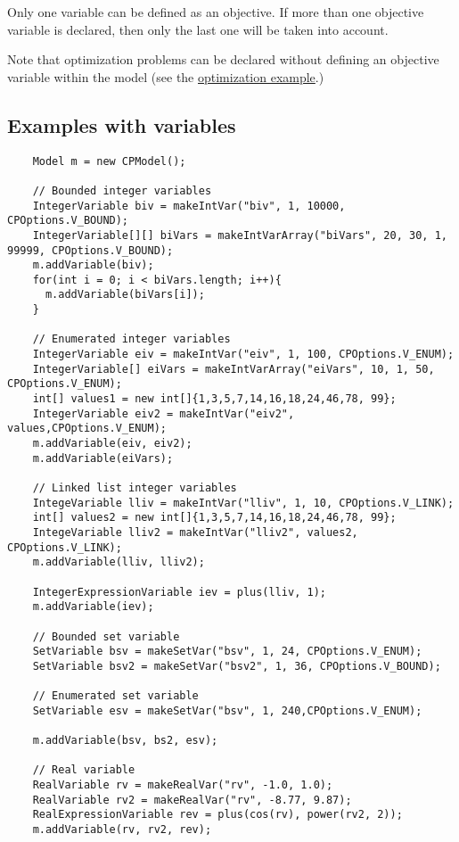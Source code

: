 Only one variable can be defined as an objective. If more than one objective variable is declared, then only the last one will be taken into account.

Note that optimization problems can be declared without defining an objective variable within the model (see the \hyperlink{solver:optimization}{optimization example}.)

\subsection{Examples with variables}\label{model:exampleswithvariables}\hypertarget{model:exampleswithvariables}{}
\begin{lstlisting}
	Model m = new CPModel();
	
	// Bounded integer variables
	IntegerVariable biv = makeIntVar("biv", 1, 10000, CPOptions.V_BOUND);
	IntegerVariable[][] biVars = makeIntVarArray("biVars", 20, 30, 1, 99999, CPOptions.V_BOUND);
	m.addVariable(biv);
	for(int i = 0; i < biVars.length; i++){
	  m.addVariable(biVars[i]);
	}
	
	// Enumerated integer variables
	IntegerVariable eiv = makeIntVar("eiv", 1, 100, CPOptions.V_ENUM);
	IntegerVariable[] eiVars = makeIntVarArray("eiVars", 10, 1, 50, CPOptions.V_ENUM);
	int[] values1 = new int[]{1,3,5,7,14,16,18,24,46,78, 99};
	IntegerVariable eiv2 = makeIntVar("eiv2", values,CPOptions.V_ENUM);
	m.addVariable(eiv, eiv2);
	m.addVariable(eiVars);
	
	// Linked list integer variables
	IntegeVariable lliv = makeIntVar("lliv", 1, 10, CPOptions.V_LINK);
	int[] values2 = new int[]{1,3,5,7,14,16,18,24,46,78, 99};
	IntegeVariable lliv2 = makeIntVar("lliv2", values2, CPOptions.V_LINK);
	m.addVariable(lliv, lliv2);
	
	IntegerExpressionVariable iev = plus(lliv, 1);
	m.addVariable(iev);
	
	// Bounded set variable
	SetVariable bsv = makeSetVar("bsv", 1, 24, CPOptions.V_ENUM);
	SetVariable bsv2 = makeSetVar("bsv2", 1, 36, CPOptions.V_BOUND);
	
	// Enumerated set variable
	SetVariable esv = makeSetVar("bsv", 1, 240,CPOptions.V_ENUM);
	
	m.addVariable(bsv, bs2, esv);
	
	// Real variable
	RealVariable rv = makeRealVar("rv", -1.0, 1.0);
	RealVariable rv2 = makeRealVar("rv", -8.77, 9.87);
	RealExpressionVariable rev = plus(cos(rv), power(rv2, 2));
	m.addVariable(rv, rv2, rev);
\end{lstlisting}


